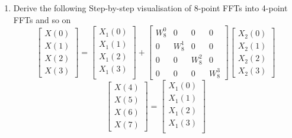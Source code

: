 \documentclass[journal,12pt,twocolumn]{IEEEtran}
\renewcommand\thesection{\arabic{section}}
\begin{document}
\begin{enumerate}[label=\arabic*.,ref=\thesection.\theenumi]
	\item Derive the following Step-by-step visualisation  of
	8-point FFTs into 4-point FFTs and so on
	\begin{equation}
		\begin{bmatrix}
			X(0) \\ 
			X(1) \\ 
			X(2) \\ 
			X(3)
		\end{bmatrix}
		=
		\begin{bmatrix}
			X_{1}(0) \\ 
			X_{1}(1)\\ 
			X_{1}(2)\\
			X_{1}(3)\\
		\end{bmatrix}
		+
		\begin{bmatrix}
			W^{0}_{8} & 0 & 0 & 0\\
			0 & W^{1}_{8} & 0 & 0\\
			0 & 0 & W^{2}_{8} & 0\\
			0 & 0 & 0 & W^{3}_{8}
		\end{bmatrix}
		\begin{bmatrix}
			X_{2}(0) \\ 
			X_{2}(1) \\ 
			X_{2}(2) \\
			X_{2}(3)
		\end{bmatrix}
	\end{equation}
	\begin{equation}
		\begin{bmatrix}
			X(4) \\ 
			X(5) \\ 
			X(6) \\ 
			X(7)
		\end{bmatrix}
		=
		\begin{bmatrix}
			X_{1}(0) \\ 
			X_{1}(1)\\ 
			X_{1}(2)\\
			X_{1}(3)\\
		\end{bmatrix}

\end{equation}
\end{enumerate}
\end{document}
